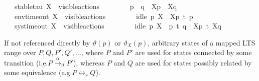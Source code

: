 \begin{isabellebody}
\ \ {\isacharbar}{\kern0pt}\ stable{\isacharunderscore}{\kern0pt}tau{\isacharcolon}{\kern0pt}\ {\isacartoucheopen}X\ {\isasymsubseteq}\ visible{\isacharunderscore}{\kern0pt}actions\ {\isasymLongrightarrow}\ \isanewline
\ \ \ \ \ \ p\ {\isasymlongmapsto}{\isasymtau}\ q\ {\isasymLongrightarrow}\ {\isasymtheta}{\isacharbrackleft}{\kern0pt}X{\isacharbrackright}{\kern0pt}{\isacharparenleft}{\kern0pt}p{\isacharparenright}{\kern0pt}\ {\isasymlongmapsto}\isactrlsup {\isasymtheta}{\isasymtau}\ {\isasymtheta}{\isacharbrackleft}{\kern0pt}X{\isacharbrackright}{\kern0pt}{\isacharparenleft}{\kern0pt}q{\isacharparenright}{\kern0pt}{\isacartoucheclose}\isanewline
\ \ {\isacharbar}{\kern0pt}\ env{\isacharunderscore}{\kern0pt}timeout{\isacharcolon}{\kern0pt}\ {\isacartoucheopen}X\ {\isasymsubseteq}\ visible{\isacharunderscore}{\kern0pt}actions\ {\isasymLongrightarrow}\ \isanewline
\ \ \ \ \ \ idle\ p\ X\ {\isasymLongrightarrow}\ {\isasymtheta}{\isacharbrackleft}{\kern0pt}X{\isacharbrackright}{\kern0pt}{\isacharparenleft}{\kern0pt}p{\isacharparenright}{\kern0pt}\ {\isasymlongmapsto}\isactrlsup {\isasymtheta}t{\isacharunderscore}{\kern0pt}{\isasymepsilon}\ {\isasymtheta}{\isacharparenleft}{\kern0pt}p{\isacharparenright}{\kern0pt}{\isacartoucheclose}\isanewline
\ \ {\isacharbar}{\kern0pt}\ sys{\isacharunderscore}{\kern0pt}timeout{\isacharcolon}{\kern0pt}\ {\isacartoucheopen}X\ {\isasymsubseteq}\ visible{\isacharunderscore}{\kern0pt}actions\ {\isasymLongrightarrow}\ \isanewline
\ \ \ \ \ \ idle\ p\ X\ {\isasymLongrightarrow}\ p\ {\isasymlongmapsto}t\ q\ {\isasymLongrightarrow}\ {\isasymtheta}{\isacharbrackleft}{\kern0pt}X{\isacharbrackright}{\kern0pt}{\isacharparenleft}{\kern0pt}p{\isacharparenright}{\kern0pt}\ {\isasymlongmapsto}\isactrlsup {\isasymtheta}t\ {\isasymtheta}{\isacharbrackleft}{\kern0pt}X{\isacharbrackright}{\kern0pt}{\isacharparenleft}{\kern0pt}q{\isacharparenright}{\kern0pt}{\isacartoucheclose}%
\isadelimdocument
%
\endisadelimdocument
%
\isatagdocument
%
\isamarkuptrue%
%
\endisatagdocument
{\isafolddocument}%
%
\isadelimdocument
%
\endisadelimdocument
%
\begin{isamarkuptext}%
If not referenced directly by $\vartheta(p)$ or $\vartheta_X(p)$, arbitrary states of a mapped LTS range over $P, Q, P', Q', \dots$, where $P$ and $P'$ are used for states connected by some transition (i.e.\@ $P \xrightarrow{\alpha}_\vartheta P'$), whereas $P$ and $Q$ are used for states possibly related by some equivalence (e.g.\@ $P \leftrightarrow_r Q$).%
\end{isamarkuptext}\isamarkuptrue%

\end{isabellebody}
